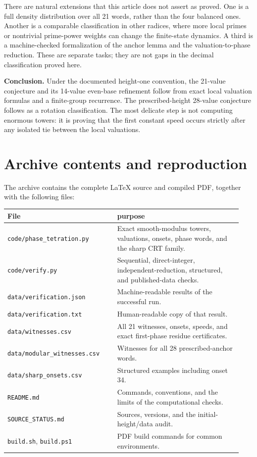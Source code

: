 \documentclass[11pt,letterpaper]{article}
\numberwithin{equation}{section}
\theoremstyle{definition}
\begin{document}
There are natural extensions that this article does not assert as proved.
One is a full density distribution over all 21 words, rather than the four
balanced ones. Another is a comparable classification in other radices,
where more local primes or nontrivial prime-power weights can change the
finite-state dynamics. A third is a machine-checked formalization of the
anchor lemma and the valuation-to-phase reduction. These are separate tasks;
they are not gaps in the decimal classification proved here.

\begin{resultbox}
\textbf{Conclusion.} Under the documented height-one convention, the
21-value conjecture and its 14-value even-base refinement follow from exact
local valuation formulas and a finite-group recurrence. The prescribed-height
28-value conjecture follows as a rotation classification. The most delicate
step is not computing enormous towers: it is proving that the first constant
speed occurs strictly after any isolated tie between the local valuations.
\end{resultbox}

\appendix
\section{Archive contents and reproduction}
The archive contains the complete \LaTeX{} source and compiled PDF, together
with the following files:
\begin{center}
\begin{tabular}{@{}p{0.44\linewidth}p{0.50\linewidth}@{}}
\toprule
File & purpose\\
\midrule
\texttt{code/phase\_tetration.py} & Exact smooth-modulus towers, valuations,
onsets, phase words, and the sharp CRT family.\\
\texttt{code/verify.py} & Sequential, direct-integer, independent-reduction,
structured, and published-data checks.\\
\texttt{data/verification.json} & Machine-readable results of the successful run.\\
\texttt{data/verification.txt} & Human-readable copy of that result.\\
\texttt{data/witnesses.csv} & All 21 witnesses, onsets, speeds, and exact
first-phase residue certificates.\\
\texttt{data/modular\_witnesses.csv} & Witnesses for all 28 prescribed-anchor words.\\
\texttt{data/sharp\_onsets.csv} & Structured examples including onset 34.\\
\texttt{README.md} & Commands, conventions, and the limits of the computational checks.\\
\texttt{SOURCE\_STATUS.md} & Sources, versions, and the initial-height/data audit.\\
\texttt{build.sh}, \texttt{build.ps1} & PDF build commands for common environments.\\
\bottomrule
\end{tabular}
\end{center}
\end{document}
